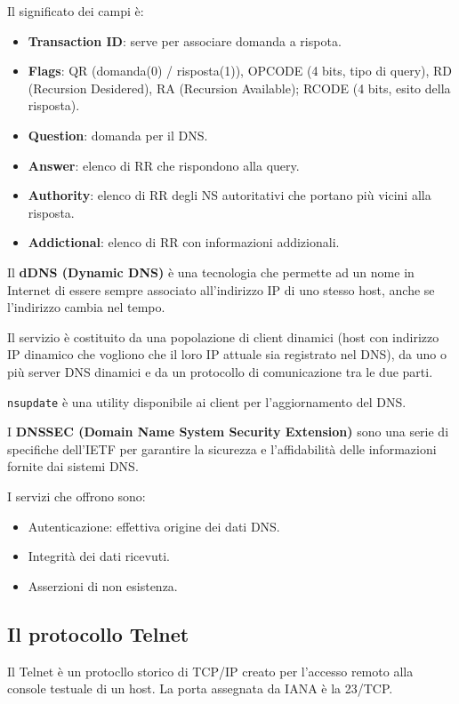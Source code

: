             Il significato dei campi è:
            \begin{itemize}
                \item \textbf{Transaction ID}: serve per associare domanda a rispota.
                \item \textbf{Flags}: QR (domanda(0) / risposta(1)), OPCODE (4 bits, tipo di query), RD (Recursion Desidered), RA (Recursion Available); RCODE (4 bits, esito della risposta).
                \item \textbf{Question}: domanda per il DNS.
                \item \textbf{Answer}: elenco di RR che rispondono alla query.
                \item \textbf{Authority}: elenco di RR degli NS autoritativi che portano più vicini alla risposta.
                \item \textbf{Addictional}: elenco di RR con informazioni addizionali.
            \end{itemize}

            Il \textbf{dDNS (Dynamic DNS)} è una tecnologia che permette ad un nome in Internet di essere sempre associato all'indirizzo IP di uno stesso host, anche se l'indirizzo cambia nel tempo.

            Il servizio è costituito da una popolazione di client dinamici (host con indirizzo IP dinamico che vogliono che il loro IP attuale sia registrato nel DNS), da uno o più server DNS dinamici e da un protocollo di comunicazione tra le due parti.

            \verb:nsupdate: è una utility disponibile ai client per l'aggiornamento del DNS.

            I \textbf{DNSSEC (Domain Name System Security Extension)} sono una serie di specifiche dell'IETF per garantire la sicurezza e l'affidabilità delle informazioni fornite dai sistemi DNS.

            I servizi che offrono sono:
            \begin{itemize}
                \item Autenticazione: effettiva origine dei dati DNS.
                \item Integrità dei dati ricevuti.
                \item Asserzioni di non esistenza.
            \end{itemize}

    \subsection{Il protocollo Telnet}
        Il Telnet è un protocllo storico di TCP/IP creato per l'accesso remoto alla console testuale di un host. La porta assegnata da IANA è la 23/TCP.
    
